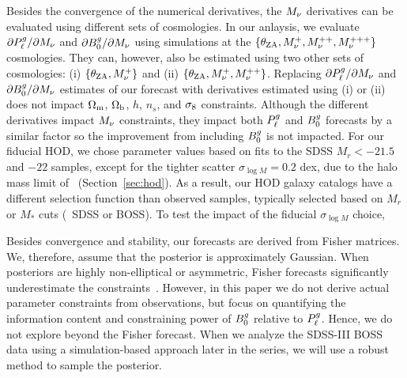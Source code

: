 Besides the convergence of the numerical derivatives, the $M_\nu$ derivatives
can be evaluated using different sets of cosmologies. In our anlaysis, we
evaluate ${\partial P^g_{\ell}}/{\partial M_\nu}$ and ${\partial B^g_0}/{\partial
M_\nu}$ using simulations at the $\{\theta_{\rm ZA}, M_\nu^+, M_\nu^{++},
M_\nu^{+++}\}$ cosmologies. They can, however, also be estimated using 
two other sets of cosmologies: (i) $\{\theta_{\rm ZA}, M_\nu^+\}$ and (ii)
$\{\theta_{\rm ZA}, M_\nu^+, M_\nu^{++}\}$. Replacing ${\partial
P^g_{\ell}}/{\partial M_\nu}$ and ${\partial B^g_0}/{\partial M_\nu}$ estimates of our
forecast with derivatives estimated using (i) or (ii) does not impact 
$\Omega_{\rm m}$, $\Omega_{\rm b}$, $h$, $n_s$, and $\sigma_8$ constraints. Although the different
derivatives impact $M_\nu$ constraints, they impact both $P^g_{\ell}$ and $B^g_0$
forecasts by a similar factor so the improvement from including $B^g_0$
is not impacted.
For our fiducial HOD, we chose parameter values based on \cite{zheng2007} 
fits to the SDSS $M_r < -21.5$  and $-22$ samples, except for the tighter
scatter $\sigma_{\log M} = 0.2$ dex, due to the halo mass limit of 
\quij~(Section~\ref{sec:hod}). As a result, our HOD galaxy 
catalogs have a different selection function than observed samples, typically
selected based on $M_r$ or $M_*$ cuts (\eg~SDSS or BOSS). To test the impact
of the fiducial $\sigma_{\log M}$ choice, 

Besides convergence and stability, our forecasts are derived from Fisher
matrices. We, therefore, assume that the posterior is approximately Gaussian. 
When posteriors are highly non-elliptical or asymmetric, Fisher forecasts 
significantly underestimate the constraints~\citep{wolz2012}. However, in
this paper we do not derive actual parameter constraints from observations, 
but focus on quantifying the information content and constraining power of 
$B^g_0$ relative to
$P^g_{\ell}$. Hence, we do not explore beyond the Fisher forecast. When we analyze
the SDSS-III BOSS data using a simulation-based approach later in the series,
we will use a robust method to sample the posterior. 

